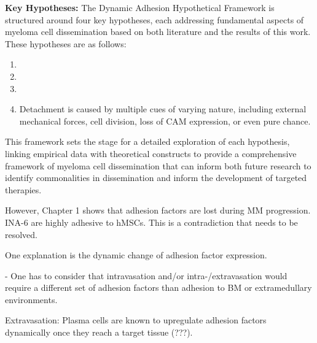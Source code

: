 \newcommand{\caddtrigger}{%
      Detachment is caused by multiple cues of varying nature, including
      external mechanical forces, cell division, loss of \ac{CAM} expression, or
      even pure chance. }%
\newcommand{\caddtriggertitle}{ %
      \textit{Hypothesis 4}: Detachment is Caused by Multiple Cues of Varying
      Nature %
}%




\textbf{Key Hypotheses:}
The Dynamic Adhesion Hypothetical Framework is structured around four key
hypotheses, each addressing fundamental aspects of myeloma cell dissemination
based on both literature and the results of this work. These hypotheses are as
follows:
\begin{enumerate}
      \item \caddadaptation
      \item \caddadaptibility
      \item \cadddiversity
      \item \caddtrigger
\end{enumerate}

This framework sets the stage for a detailed exploration of each hypothesis,
linking empirical data with theoretical constructs to provide a comprehensive
framework of myeloma cell dissemination that can inform both future research
to identify commonalities in dissemination and inform the development of targeted
therapies.



\unnsubsection{\caddadaptationtitle}%
\label{sec:discussion_caddadaptation}%
However,  Chapter 1 shows that adhesion factors are
lost during MM progression. INA-6 are highly adhesive to hMSCs.
This is a contradiction that needs to be resolved.

One explanation is the dynamic change of adhesion factor expression.


- One has to consider that intravasation and/or intra-/extravasation would require a different
set of adhesion factors than adhesion to BM or extramedullary environments.

Extravasation: Plasma cells are known to upregulate adhesion factors dynamically
once they reach a target tissue (???).

